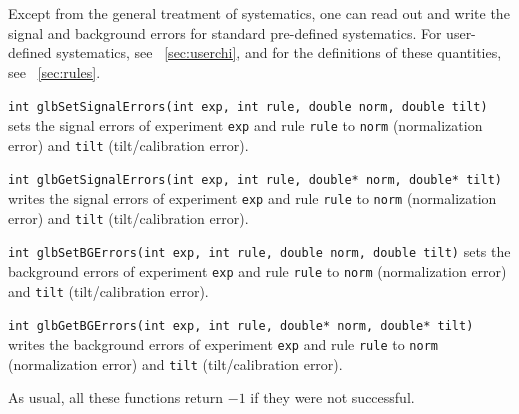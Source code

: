 Except from the general treatment of systematics, one can read out
and write the signal and background errors for standard pre-defined systematics.
For user-defined systematics, see \Sec~\ref{sec:userchi}, and 
for the definitions of these quantities, see \Sec~\ref{sec:rules}.
\begin{function}
{\tt int glbSetSignalErrors(int exp, int rule, double norm, double tilt)}
sets the signal errors of experiment {\tt exp} and rule {\tt rule}
to {\tt norm} (normalization error) and {\tt tilt} (tilt/calibration error).
\end{function}
\begin{function}
{\tt int glbGetSignalErrors(int exp, int rule, double* norm, double* tilt)}
writes the signal errors of experiment {\tt exp} and rule {\tt rule}
to {\tt norm} (normalization error) and {\tt tilt} (tilt/calibration error).
\end{function}
\begin{function}
{\tt int glbSetBGErrors(int exp, int rule, double norm, double tilt)}
sets the background errors of experiment {\tt exp} and rule {\tt rule}
to {\tt norm} (normalization error) and {\tt tilt} (tilt/calibration error).
\end{function}
\begin{function}
{\tt int glbGetBGErrors(int exp, int rule, double* norm, double* tilt)}
writes the background errors of experiment {\tt exp} and rule {\tt rule}
to {\tt norm} (normalization error) and {\tt tilt} (tilt/calibration error).
\end{function}
%
As usual, all these functions return $-1$ if they were not successful.

